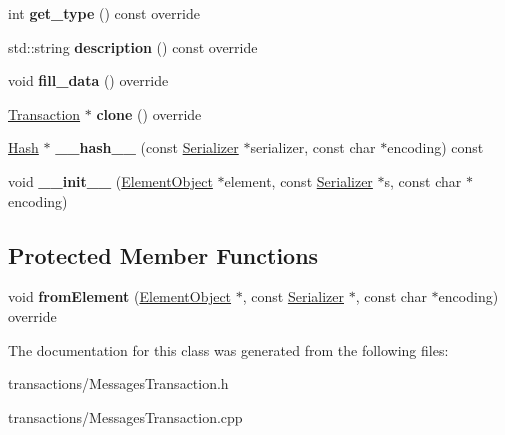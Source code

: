 \begin{DoxyCompactItemize}
int {\bfseries get\+\_\+type} () const override
\item 
\mbox{\label{classMessagesTransaction_a8cf65215291254275a1dd989f0971bd4}} 
std\+::string {\bfseries description} () const override
\item 
\mbox{\label{classMessagesTransaction_aeca5802e7f1bd57e38468dc3394e2825}} 
void {\bfseries fill\+\_\+data} () override
\item 
\mbox{\label{classMessagesTransaction_a290e38ea445bba3f62956c660607c03f}} 
\mbox{\hyperlink{classTransaction}{Transaction}} $\ast$ {\bfseries clone} () override
\item 
\mbox{\label{classTransaction_a1f0df166c34d6a38a991544cf98c0356}} 
\mbox{\hyperlink{classHash}{Hash}} $\ast$ {\bfseries \+\_\+\+\_\+hash\+\_\+\+\_\+} (const \mbox{\hyperlink{classSerializer}{Serializer}} $\ast$serializer, const char $\ast$encoding) const
\item 
\mbox{\label{classComponent_a28212595f8ee85fe009bd233bc99b2fc}} 
void {\bfseries \+\_\+\+\_\+init\+\_\+\+\_\+} (\mbox{\hyperlink{classElementObject}{Element\+Object}} $\ast$element, const \mbox{\hyperlink{classSerializer}{Serializer}} $\ast$s, const char $\ast$encoding)
\end{DoxyCompactItemize}
\subsection*{Protected Member Functions}
\begin{DoxyCompactItemize}
\item 
\mbox{\label{classMessagesTransaction_aa70ed75ff16f6afa61d82458488069d4}} 
void {\bfseries from\+Element} (\mbox{\hyperlink{classElementObject}{Element\+Object}} $\ast$, const \mbox{\hyperlink{classSerializer}{Serializer}} $\ast$, const char $\ast$encoding) override
\end{DoxyCompactItemize}


The documentation for this class was generated from the following files\+:\begin{DoxyCompactItemize}
\item 
transactions/Messages\+Transaction.\+h\item 
transactions/Messages\+Transaction.\+cpp\end{DoxyCompactItemize}
